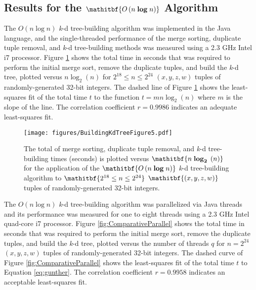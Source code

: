 \documentclass{sig-alternate}
\begin{document}
\subsection{Results for the $\mathitbf{O\left(n \; \boldsymbol{\log} \; n\right)}$ Algorithm}
\label{sec:nlogn_results}

The $O\left(n \log n\right)$ \emph{k}-d tree-building algorithm was implemented in the Java language, and the single-threaded performance of the merge sorting, duplicate tuple removal, and \emph{k}-d tree-building methods was measured using a 2.3 GHz Intel i7 processor.  Figure \ref{fig:ComparativeTime} shows the total time in seconds that was required to perform the initial merge sort, remove the duplicate tuples, and build the \emph{k}-d tree, plotted versus $n \log_2 \left(n\right)$ for $2^{18} \le n \le 2^{24}$ $\left(x,y,z,w\right)$ tuples of randomly-generated 32-bit integers.  The dashed line of Figure \ref{fig:ComparativeTime} shows the least-squares fit of the total time $t$ to the function $t = mn \log_2 \left(n\right)$ where $m$ is the slope of the line.  The correlation coefficient $r = 0.9986$ indicates an adequate least-squares fit.

\begin{figure}[h!]
\centering
\centerline{\texttt{[image: figures/BuildingKdTreeFigure5.pdf]}}
\caption{The total of merge sorting, duplicate tuple removal, and \emph{k}-d tree-building times (seconds) is plotted versus $\mathitbf{n \; \boldsymbol{\log_2} \; \left(n\right)}$ for the application of the $\mathitbf{O\left(n \; \boldsymbol{\log} \; n\right)}$ \emph{k}-d tree-building algorithm to $\mathitbf{2^{18} \le n \le 2^{24}}$ $\mathitbf{\left(x,y,z,w\right)}$ tuples of randomly-generated 32-bit integers.}
\label{fig:ComparativeTime}
\end{figure}

\newpage

The $O\left(n \log n\right)$ \emph{k}-d tree-building algorithm was parallelized via Java threads and its performance was measured for one to eight threads using a 2.3 GHz Intel quad-core i7 processor.  Figure \ref{fig:ComparativeParallel} shows the total time in seconds that was required to perform the initial merge sort, remove the duplicate tuples, and build the \emph{k}-d tree, plotted versus the number of threads $q$ for $n=2^{24}$ $\left(x,y,z,w\right)$ tuples of randomly-generated 32-bit integers. The dashed curve of Figure \ref{fig:ComparativeParallel} shows the least-squares fit of the total time $t$ to Equation \ref{eq:gunther}.  The correlation coefficient $r=0.9958$ indicates an acceptable least-squares fit.
\end{document}
